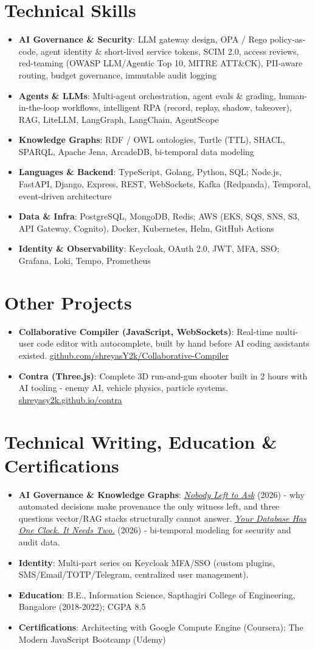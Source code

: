 \documentclass[a4paper,11pt]{article}
\newcommand{\resumeItem}[2]{\item\small{\textbf{#1}{: #2 \vspace{-1pt}}}}
\newcommand{\resumeSubItem}[2]{\resumeItem{#1}{#2}\vspace{-2pt}}
\newcommand{\resumeSubHeadingListStart}{\begin{itemize}[leftmargin=*]}
\newcommand{\resumeSubHeadingListEnd}{\end{itemize}}
\begin{document}
\section{Technical Skills}
  \resumeSubHeadingListStart
    \resumeSubItem{AI Governance \& Security}{LLM gateway design, OPA / Rego policy-as-code, agent identity \& short-lived service tokens, SCIM 2.0, access reviews, red-teaming (OWASP LLM/Agentic Top 10, MITRE ATT\&CK), PII-aware routing, budget governance, immutable audit logging}
    \resumeSubItem{Agents \& LLMs}{Multi-agent orchestration, agent evals \& grading, human-in-the-loop workflows, intelligent RPA (record, replay, shadow, takeover), RAG, LiteLLM, LangGraph, LangChain, AgentScope}
    \resumeSubItem{Knowledge Graphs}{RDF / OWL ontologies, Turtle (TTL), SHACL, SPARQL, Apache Jena, ArcadeDB, bi-temporal data modeling}
    \resumeSubItem{Languages \& Backend}{TypeScript, Golang, Python, SQL; Node.js, FastAPI, Django, Express, REST, WebSockets, Kafka (Redpanda), Temporal, event-driven architecture}
    \resumeSubItem{Data \& Infra}{PostgreSQL, MongoDB, Redis; AWS (EKS, SQS, SNS, S3, API Gateway, Cognito), Docker, Kubernetes, Helm, GitHub Actions}
    \resumeSubItem{Identity \& Observability}{Keycloak, OAuth 2.0, JWT, MFA, SSO; Grafana, Loki, Tempo, Prometheus}
  \resumeSubHeadingListEnd

\section{Other Projects}
  \resumeSubHeadingListStart
    \resumeSubItem{Collaborative Compiler (JavaScript, WebSockets)}
      {Real-time multi-user code editor with autocomplete, built by hand before AI coding assistants existed. \href{https://github.com/shreyasY2k/Collaborative-Compiler}{github.com/shreyasY2k/Collaborative-Compiler}}
    \resumeSubItem{Contra (Three.js)}
      {Complete 3D run-and-gun shooter built in 2 hours with AI tooling - enemy AI, vehicle physics, particle systems. \href{https://shreyasy2k.github.io/contra}{shreyasy2k.github.io/contra}}
  \resumeSubHeadingListEnd

\section{Technical Writing, Education \& Certifications}
  \resumeSubHeadingListStart
    \resumeSubItem{AI Governance \& Knowledge Graphs}{\href{https://medium.com/@shreyasmk.mathur/nobody-left-to-ask-51ebbe36e5d7}{\textit{Nobody Left to Ask}} (2026) - why automated decisions make provenance the only witness left, and three questions vector/RAG stacks structurally cannot answer. \href{https://medium.com/@shreyasmk.mathur/your-database-has-one-clock-it-needs-two-9890210cb73f}{\textit{Your Database Has One Clock. It Needs Two.}} (2026) - bi-temporal modeling for security and audit data.}
    \resumeSubItem{Identity}{Multi-part series on Keycloak MFA/SSO (custom plugins, SMS/Email/TOTP/Telegram, centralized user management).}
    \resumeSubItem{Education}{B.E., Information Science, Sapthagiri College of Engineering, Bangalore (2018-2022); CGPA 8.5}
    \resumeSubItem{Certifications}{Architecting with Google Compute Engine (Coursera); The Modern JavaScript Bootcamp (Udemy)}
  \resumeSubHeadingListEnd
\end{document}
